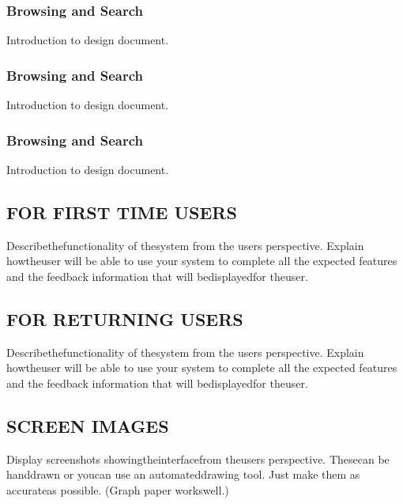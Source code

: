 \documentclass[twoside,letterpaper]{article}
\begin{document}
\subsubsection[Browsing and Search]{\rmfamily\bfseries\color{black}
Browsing and Search}
{\rmfamily\color{black}
Introduction to design document.
}

\subsubsection[Form Entry]{\rmfamily\bfseries\color{black}
Browsing and Search}
{\rmfamily\color{black}
Introduction to design document.
}

\subsubsection[Delayed Upload]{\rmfamily\bfseries\color{black}
Browsing and Search}
{\rmfamily\color{black}
Introduction to design document.
}

\subsection[FOR FIRST TIME USERS]{\rmfamily\bfseries\color{black}
FOR FIRST TIME USERS}
{\rmfamily\color{black}
Describethefunctionality of thesystem from the users perspective. Explain howtheuser
will be able to use your system to complete all the expected features and the feedback
information that will bedisplayedfor theuser.
}

\subsection[FOR RETURNING USERS]{\rmfamily\bfseries\color{black}
FOR RETURNING USERS}
{\rmfamily\color{black}
Describethefunctionality of thesystem from the users perspective. Explain howtheuser
will be able to use your system to complete all the expected features and the feedback
information that will bedisplayedfor theuser.
}

\subsection[SCREEN IMAGES]{\rmfamily\bfseries\color{black}
SCREEN IMAGES}
{\rmfamily\color{black}
Display screenshots showingtheinterfacefrom theusers perspective. Thesecan be handdrawn
or youcan use an automateddrawing tool. Just make them as accurateas possible.
(Graph paper workswell.)
}
\end{document}
